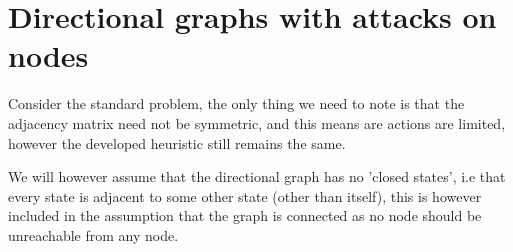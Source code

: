 \documentclass[a4paper,10pt]{article}
\theoremstyle{definition}
\theoremstyle{definition}
\theoremstyle{remark}
\theoremstyle{definition}
\begin{document}
\section{Directional graphs with attacks on nodes}
\label{Appendix: directional graphs with attacks on nodes}
Consider the standard problem, the only thing we need to note is that the adjacency matrix need not be symmetric, and this means are actions are limited, however the developed heuristic still remains the same.

We will however assume that the directional graph has no 'closed states', i.e that every state is adjacent to some other state (other than itself), this is however included in the assumption that the graph is connected as no node should be unreachable from any node.
\end{document}
